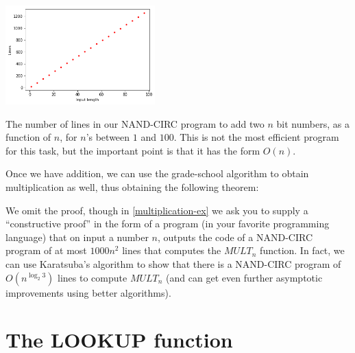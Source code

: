 \begin{marginfigure}
\centering
\includegraphics[width=\linewidth, height=1.5in, keepaspectratio]{../figure/addnumberoflines.png}
\caption{The number of lines in our NAND-CIRC program to add two \(n\)
bit numbers, as a function of \(n\), for \(n\)'s between \(1\) and
\(100\). This is not the most efficient program for this task, but the
important point is that it has the form \(O(n)\).}
\label{addnumoflinesfig}
\end{marginfigure}

Once we have addition, we can use the grade-school algorithm to obtain
multiplication as well, thus obtaining the following theorem:

\hypertarget{theoremid}{}

We omit the proof, though in \cref{multiplication-ex} we ask you to
supply a ``constructive proof'' in the form of a program (in your
favorite programming language) that on input a number \(n\), outputs the
code of a NAND-CIRC program of at most \(1000n^2\) lines that computes
the \(\ensuremath{\mathit{MULT}}_n\) function. In fact, we can use
Karatsuba's algorithm to show that there is a NAND-CIRC program of
\(O(n^{\log_2 3})\) lines to compute \(\ensuremath{\mathit{MULT}}_n\)
(and can get even further asymptotic improvements using better
algorithms).

\section{The LOOKUP function}\label{seclookupfunc}

